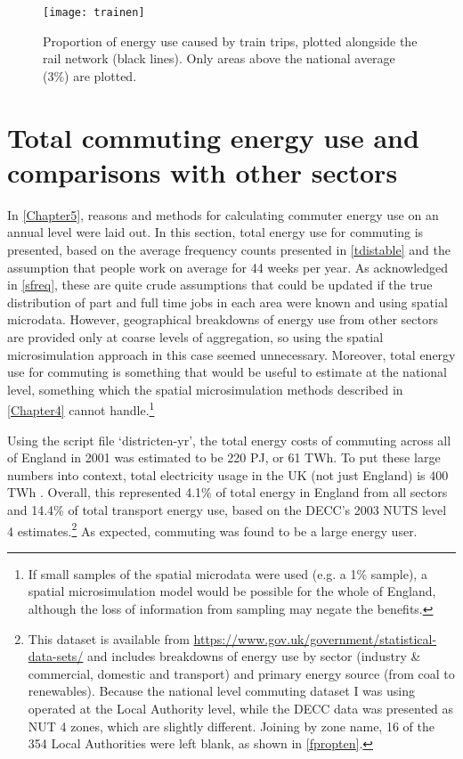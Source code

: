 \begin{figure}[htbp]
\begin{center}
    \texttt{[image: trainen]}  \end{center}
  \caption[Proportion of energy use caused by train trips]
  {Proportion of energy use caused by train trips, plotted alongside the rail
network (black lines). Only areas above the national average (3\%) are
plotted.}
 \label{ftrainen}
\end{figure}

\section{Total commuting energy use and comparisons with other sectors}
\label{stotalcomp}
In \cref{Chapter5}, reasons and methods for calculating commuter energy use
on an annual level were laid out. In this section, total energy use
for commuting is presented, based on the average frequency counts presented
in \cref{tdistable} and the assumption that people work on average for
44 weeks per year. As acknowledged in \cref{sfreq}, these are quite crude
assumptions that could be updated if the true distribution of part and
full time jobs in each area were known and using spatial microdata.
However, geographical breakdowns of energy use from other sectors are
provided only at coarse levels of aggregation, so using the spatial
microsimulation approach in this case seemed unnecessary. Moreover, total
energy use for commuting is something that would be useful to estimate at
the national level, something which the spatial microsimulation methods
described in \cref{Chapter4} cannot
handle.\footnote{If small samples of the
spatial microdata were used (e.g. a 1\% sample), a spatial microsimulation
model would be possible for the whole of England, although the loss of
information from sampling may negate the benefits.
}

Using the script file `districten-yr', the total energy costs of commuting
across all of England in 2001 was estimated to be 220 PJ, or 61 TWh.
To put these large numbers into context, total electricity usage in the UK
(not just England) is 400 TWh \citep{MacKay2009}. Overall, this represented
4.1\% of total energy in England from all sectors and 14.4\% of total transport
energy use, based on the DECC's 2003 NUTS level 4
estimates.\footnote{This
dataset is available from {\color{blue} \href{https://www.gov.uk/government/statistical-data-sets/total-final-energy-consumption-at-regional-and-local-authority level-2005-to-2010}{https://www.gov.uk/government/statistical-data-sets/}}
and includes breakdowns of energy use by sector (industry \& commercial, domestic and transport)
and primary energy source (from coal to renewables).
Because the national level commuting dataset I was using operated at the
Local Authority level, while the DECC data was presented as NUT 4 zones,
which are slightly different. Joining by zone name, 16 of the 354 Local
Authorities were left blank, as shown in \cref{fpropten}.
}
As expected, commuting was found to be a large energy user.

